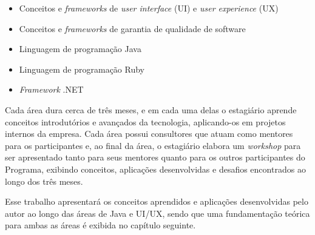 \begin{itemize}
	\item Conceitos e \textit{frameworks} de \textit{user interface} (UI) e \textit{user experience} (UX)
	\item Conceitos e \textit{frameworks} de garantia de qualidade de software
	\item Linguagem de programação Java
	\item Linguagem de programação Ruby
	\item \textit{Framework} .NET
\end{itemize}

Cada área dura cerca de três meses, e em cada uma delas o estagiário aprende conceitos introdutórios e avançados da tecnologia, aplicando-os em projetos internos da empresa. Cada área possui consultores que atuam como mentores para os participantes e, ao final da área, o estagiário elabora um \textit{workshop} para ser apresentado tanto para seus mentores quanto para os outros participantes do Programa, exibindo conceitos, aplicações desenvolvidas e desafios encontrados ao longo dos três meses.

Esse trabalho apresentará os conceitos aprendidos e aplicações desenvolvidas pelo autor ao longo das áreas de Java e UI/UX, sendo que uma fundamentação teórica para ambas as áreas é exibida no capítulo seguinte.